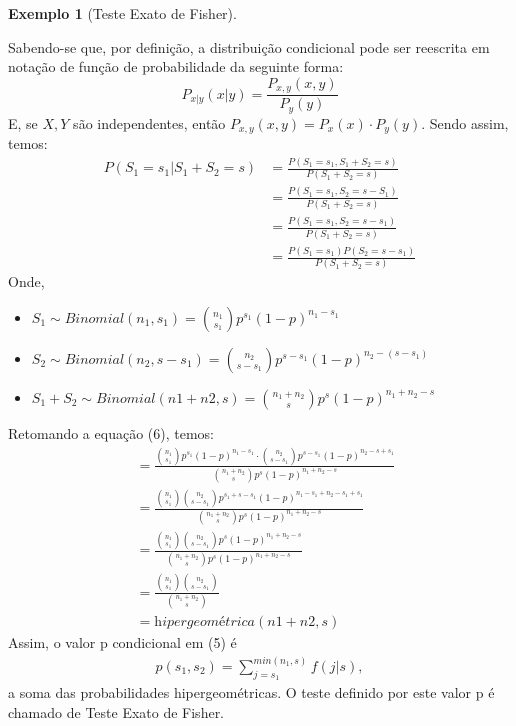 \documentclass[10pt]{article}
\theoremstyle{plain}
\theoremstyle{remark}
\theoremstyle{definition}
\newtheorem{exe}[teor]{Exemplo}
\begin{document}
\begin{exe}[Teste Exato de Fisher]
\begin{framed}
Sabendo-se que, por definição, a distribuição condicional pode ser reescrita em notação de função de probabilidade da seguinte forma:
\begin{equation*}
    P_{x|y}(x|y)=\frac{P_{x,y}(x,y)}{P_{y}(y)}
\end{equation*}
E, se $X,Y$ são independentes, então $P_{x,y}(x,y)=P_{x}(x)\cdot P_{y}(y)$. Sendo assim, temos:
\begin{align}
    P(S_1=s_1|S_1+S_2=s)&=\frac{P(S_1=s_1,S_1+S_2=s)}{P(S_1+S_2=s)}\nonumber\\
              &=\frac{P(S_1=s_1,S_2=s-S_1)}{P(S_1+S_2=s)}\nonumber\\ 
              &=\frac{P(S_1=s_1,S_2=s-s_1)}{P(S_1+S_2=s)} \nonumber \\
              &=\frac{P(S_1=s_1)P(S_2=s-s_1)}{P(S_1+S_2=s)}
\end{align}
 Onde, 
 \begin{itemize}
     \item $S_1 \sim Binomial(n_1,s_1)=\binom{n_1}{s_1}p^{s_1}(1-p)^{n_1-s_1}$ 
    \item $S_2 \sim Binomial(n_2,s-s_1)=\binom{n_2}{s-s_1}p^{s-s_1}(1-p)^{n_2-(s-s_1)}$
    \item $S_1 + S_2 \sim Binomial(n1+n2,s)=\binom{n_1+n_2}{s}p^{s}(1-p)^{n_1+n_2-s}$
 \end{itemize}
 Retomando a equação (6), temos:
 \begin{align*}
    &=\frac{\binom{n_1}{s_1}p^{s_1}(1-p)^{n_1-s_1}\cdot\binom{n_2}{s-s_1}p^{s-s_1}(1-p)^{n_2-s+s_1}}{\binom{n_1+n_2}{s}p^{s}(1-p)^{n_1+n_2-s}}\\
    &=\frac{\binom{n_1}{s_1}\binom{n_2}{s-s_1}p^{s_1+s-s_1}(1-p)^{n_1-s_1+n_2-s_1+s_1}}{\binom{n_1+n_2}{s}p^{s}(1-p)^{n_1+n_2-s}}\\
    &=\frac{\binom{n_1}{s_1}\binom{n_2}{s-s_1}p^{s}(1-p)^{n_1+n_2-s}}{\binom{n_1+n_2}{s}p^{s}(1-p)^{n_1+n_2-s}}\\
    &=\frac{\binom{n_1}{s_1}\binom{n_2}{s-s_1}}{\binom{n_1+n_2}{s}} \\
    &=\textit{hipergeométrica}(n1+n2,s)
\end{align*}
Assim, o valor p condicional em (5) é
\begin{align*}
p(s_1,s_2)=\sum_{j=s_1}^{min(n_1,s)} f(j|s),
\end{align*}
a soma das probabilidades hipergeométricas. O teste definido por este valor p é chamado de Teste Exato de Fisher. 
 \end{framed}
\end{exe}

\newpage 
\printbibliography
\end{document}
